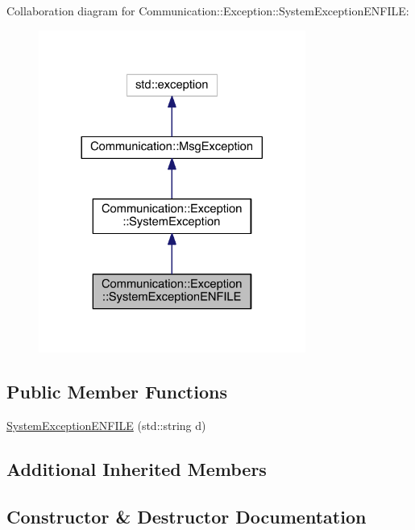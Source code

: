 Collaboration diagram for Communication\+:\+:Exception\+:\+:System\+Exception\+E\+N\+F\+I\+L\+E\+:\nopagebreak
\begin{figure}[H]
\begin{center}
\leavevmode
\includegraphics[width=248pt]{class_communication_1_1_exception_1_1_system_exception_e_n_f_i_l_e__coll__graph}
\end{center}
\end{figure}
\subsection*{Public Member Functions}
\begin{DoxyCompactItemize}
\item 
\hyperlink{class_communication_1_1_exception_1_1_system_exception_e_n_f_i_l_e_af95955f9d55271eda8cb11456aee6b31}{System\+Exception\+E\+N\+F\+I\+L\+E} (std\+::string d)
\end{DoxyCompactItemize}
\subsection*{Additional Inherited Members}


\subsection{Constructor \& Destructor Documentation}
\hypertarget{class_communication_1_1_exception_1_1_system_exception_e_n_f_i_l_e_af95955f9d55271eda8cb11456aee6b31}{}
